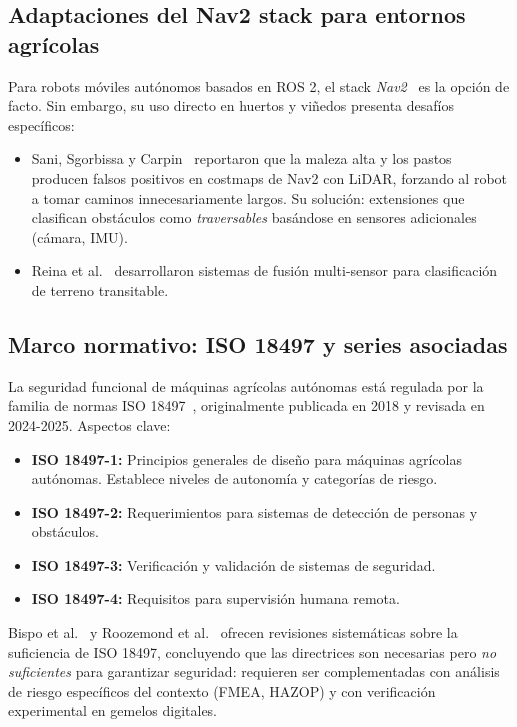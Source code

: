 \documentclass[12pt,a4paper,oneside]{book}
\begin{document}
\subsection{Adaptaciones del Nav2 stack para entornos agrícolas}

Para robots móviles autónomos basados en ROS 2, el stack \emph{Nav2}~\cite{Macenski2020} es la opción de facto. Sin embargo, su uso directo en huertos y viñedos presenta desafíos específicos:

\begin{itemize}
    \item Sani, Sgorbissa y Carpin~\cite{Sani2024} reportaron que la maleza alta y los pastos producen falsos positivos en costmaps de Nav2 con LiDAR, forzando al robot a tomar caminos innecesariamente largos. Su solución: extensiones que clasifican obstáculos como \emph{traversables} basándose en sensores adicionales (cámara, IMU).
    \item Reina et al.~\cite{Reina2017} desarrollaron sistemas de fusión multi-sensor para clasificación de terreno transitable.
\end{itemize}

\subsection{Marco normativo: ISO 18497 y series asociadas}

La seguridad funcional de máquinas agrícolas autónomas está regulada por la familia de normas ISO 18497~\cite{ISO18497}, originalmente publicada en 2018 y revisada en 2024-2025. Aspectos clave:

\begin{itemize}
    \item \textbf{ISO 18497-1:} Principios generales de diseño para máquinas agrícolas autónomas. Establece niveles de autonomía y categorías de riesgo.
    \item \textbf{ISO 18497-2:} Requerimientos para sistemas de detección de personas y obstáculos.
    \item \textbf{ISO 18497-3:} Verificación y validación de sistemas de seguridad.
    \item \textbf{ISO 18497-4:} Requisitos para supervisión humana remota.
\end{itemize}

Bispo et al.~\cite{Bispo2023} y Roozemond et al.~\cite{Roozemond2024} ofrecen revisiones sistemáticas sobre la suficiencia de ISO 18497, concluyendo que las directrices son necesarias pero \emph{no suficientes} para garantizar seguridad: requieren ser complementadas con análisis de riesgo específicos del contexto (FMEA, HAZOP) y con verificación experimental en gemelos digitales.
\end{document}

